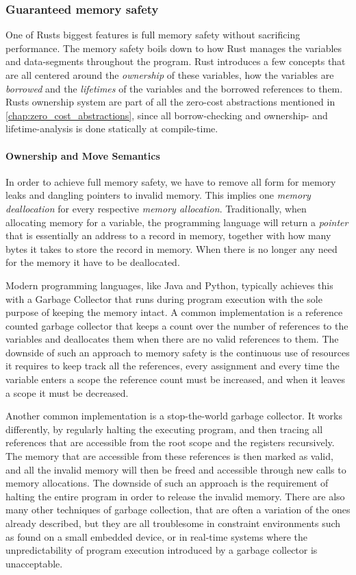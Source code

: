 \subsubsection{Guaranteed memory safety}

One of Rusts biggest features is full memory safety \cite{web:rust_book_unsafe} without sacrificing
performance. The memory safety boils down to how Rust manages the variables and data-segments
throughout the program. Rust introduces a few concepts that are all centered around the
\emph{ownership} of these variables, how the variables are \emph{borrowed} and the
\emph{lifetimes} of the variables and the borrowed references to them. Rusts ownership system are
part of all the zero-cost abstractions mentioned in \autoref{chap:zero_cost_abstractions}, since all
borrow-checking and ownership- and lifetime-analysis is done statically at compile-time.

\paragraph{Ownership and Move Semantics} \hfill

In order to achieve full memory safety, we have to remove all form for memory leaks and dangling
pointers to invalid memory. This implies one \emph{memory deallocation} for every respective
\emph{memory allocation}. Traditionally, when allocating memory for a variable, the programming
language will return a \emph{pointer} that is essentially an address to a record in memory,
together with how many bytes it takes to store the record in memory. When there is no longer any
need for the memory it have to be deallocated.

Modern programming languages, like Java and Python, typically achieves this with a Garbage Collector
that runs during program execution with the sole purpose of keeping the memory intact. A common
implementation is a reference counted garbage collector that keeps a count over the number of
references to the variables and deallocates them when there are no valid references to them. The
downside of such an approach to memory safety is the continuous use of resources it requires to keep
track all the references, every assignment and every time the variable enters a scope the reference
count must be increased, and when it leaves a scope it must be decreased.

Another common implementation is a stop-the-world garbage collector. It works differently, by
regularly halting the executing program, and then tracing all references that are accessible from
the root scope and the registers recursively. The memory that are accessible from these references
is then marked as valid, and all the invalid memory will then be freed and accessible through new
calls to memory allocations. The downside of such an approach is the requirement of halting the
entire program in order to release the invalid memory. There are also many other techniques of
garbage collection, that are often a variation of the ones already described, but they are all
troublesome in constraint environments such as found on a small embedded device, or in real-time
systems where the unpredictability of program execution introduced by a garbage collector is
unacceptable.


